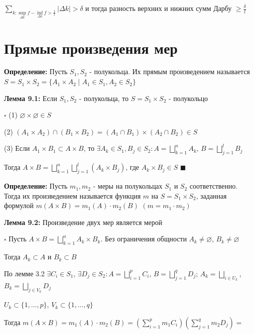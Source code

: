 \documentclass[a4paper]{report}
\begin{document}
\noindent$\sum\limits_{k\colon\sup\limits_{\Delta k}f-\inf\limits_{\Delta k}f>\frac1l}|\Delta k|>\delta$ и тогда разность верхних и нижних сумм Дарбу $\ge\frac{\delta}{l}$







\chapter{Прямые произведения мер}

\noindent\textbf{Определение:} Пусть $S_1,S_2$ - полукольца. Их прямым произведением называется $S=S_1\times S_2=\{A_1\times A_2\mid A_1\in S_1,A_2\in S_2\}$
\bigskip

\noindent\textbf{Лемма 9.1:} Если $S_1,S_2$ - полукольца, то $S=S_1\times S_2$ - полукольцо

\noindent $\square$ (1) $\varnothing\times\varnothing\in S$

(2) $(A_1\times A_2)\cap(B_1\times B_2)=(A_1\cap B_1)\times(A_2\cap B_2)\in S$

(3) Если $A_1\times B_1\subset A\times B$, то $\exists A_k\in S_1,B_j\in S_2\colon A=\bigsqcup\limits_{k=1}^n A_k$, $B=\bigsqcup\limits_{j=1}^l B_j$

Тогда $A\times B=\bigsqcup\limits_{k=1}^n\bigsqcup\limits_{j=1}^l(A_k\times B_j)$, где $A_k\times B_j\in S$ $\blacksquare$
\bigskip

\noindent\textbf{Определение:} Пусть $m_1,m_2$ - меры на полукольцах $S_1$ и $S_2$ соответственно. Тогда их произведением называется функция $m$ на $S=S_1\times S_2$, заданная формулой $m(A\times B)=m_1(A)\cdot m_2(B)$  $(m=m_1\cdot m_2)$
\bigskip

\noindent\textbf{Лемма 9.2:} Произведение двух мер является мерой

\noindent $\square$ Пусть $A\times B=\bigsqcup\limits_{k=1}^n A_k\times B_k$. Без ограничения общности $A_k\ne\varnothing$, $B_k\ne\varnothing$

Тогда $A_k\subset A$ и $B_k\subset B$

По лемме 3.2 $\exists C_i\in S_1$, $\exists D_j\in S_2\colon A=\bigsqcup\limits_{i=1}^p C_i$, $B=\bigsqcup\limits_{j=1}^q D_j$; $A_k=\bigsqcup\limits_{i\in U_k}$,
$B_k=\bigsqcup\limits_{j\in V_k}D_j$

$U_k\subset\{1,\ldots,p\}$, $V_k\subset\{1,\ldots,q\}$

Тогда $m(A\times B)=m_1(A)\cdot m_2(B)=\left(\sum\limits_{i=1}^p m_1C_i\right)\left(\sum\limits_{j=1}^q m_2 D_j\right)=$
\end{document}
